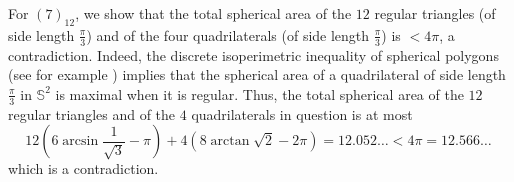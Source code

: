 \documentclass[10pt]{article}
\numberwithin{Subcase}{Case}
\begin{document}
For $(7)_{12}$, we show that the total spherical area of the $12$ regular triangles (of side length $\frac{\pi}{3}$) and of the four quadrilaterals (of side length $\frac{\pi}{3}$) is $<4\pi$, a contradiction. Indeed, the discrete isoperimetric inequality of spherical polygons (see for example \cite{CsLaNa06}) implies that the spherical area of a quadrilateral of side length $\frac{\pi}{3}$ in $\mathbb{S}^2$ is maximal when it is regular. Thus, the total spherical area of the $12$ regular triangles and of the $4$ quadrilaterals in question is at most
$$
12\left(6\arcsin\frac{1}{\sqrt{3}}-\pi\right)+4\left(8\arctan\sqrt{2}-2\pi\right)=12.052\ldots<4\pi=12.566\ldots\
$$
which is a contradiction.

\end{document}
